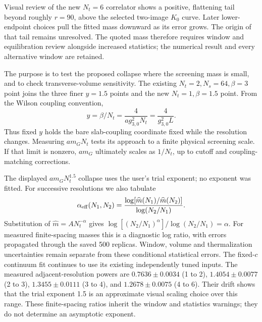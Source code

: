 \documentclass[11pt,a4paper]{article}
\begin{document}
Visual review of the new $N_t=6$ correlator shows a positive, flattening tail
beyond roughly $r=90$, above the selected two-image $K_0$ curve. Later
lower-endpoint choices pull the fitted mass downward as its error grows.
The origin of that tail remains unresolved. The quoted mass therefore
requires window and equilibration review alongside increased statistics;
the numerical result and every alternative window are retained.

The purpose is to test the proposed collapse where the screening mass is
small, and to check transverse-volume sensitivity. The existing
$N_t=2,N_s=64,\beta=3$ point joins the three finer $y=1.5$ points and
the new $N_t=1,\beta=1.5$ point. From the
Wilson coupling convention,
\[
 y=\beta/N_t=\frac{4}{ag_{3,0}^2N_t}
   =\frac{4}{g_{3,0}^2L}.
\]
Thus fixed $y$ holds the bare slab-coupling coordinate fixed while the
resolution changes. Measuring $am_GN_t$ tests its approach to a finite
physical screening scale. If that limit is nonzero, $am_G$ ultimately
scales as $1/N_t$, up to cutoff and coupling-matching corrections.

The displayed $am_GN_t^{1.5}$ collapse uses the user's trial exponent;
no exponent was fitted. For successive resolutions we also tabulate
\[
 \alpha_{\rm eff}(N_1,N_2)=
   \frac{\log[\widehat m(N_1)/\widehat m(N_2)]}{\log(N_2/N_1)}.
\]
Substitution of $\widehat m=A N_t^{-\alpha}$ gives
$\log[(N_2/N_1)^\alpha]/\log(N_2/N_1)=\alpha$.
For measured finite-spacing masses this is a diagnostic log ratio, with
errors propagated through the saved 500 replicas. Window, volume and
thermalization uncertainties remain separate from these conditional
statistical errors. The fixed-$c$ continuum fit continues to use its
existing independently tuned inputs.
The measured adjacent-resolution powers are $0.7636\pm0.0034$ (1 to 2),
$1.4054\pm0.0077$ (2 to 3),
$1.3455\pm0.0111$ (3 to 4), and $1.2678\pm0.0075$ (4 to 6).
Their drift shows that the trial exponent 1.5 is an approximate visual
scaling choice over this range. These finite-spacing ratios inherit the
window and statistics warnings; they do not determine an asymptotic exponent.
\end{document}
